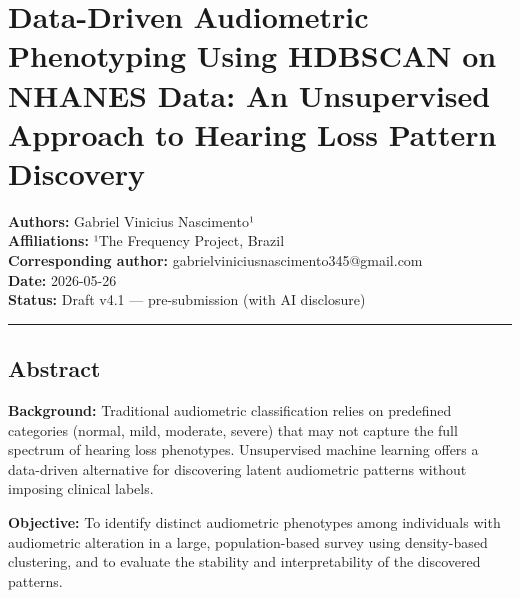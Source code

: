 \documentclass[
]{article}
\author{}
\date{}
\begin{document}

\vspace{1em}

\section{Data-Driven Audiometric Phenotyping Using HDBSCAN on NHANES Data: An
Unsupervised Approach to Hearing Loss Pattern
Discovery}\label{data-driven-audiometric-phenotyping-using-hdbscan-on-nhanes-data-an-unsupervised-approach-to-hearing-loss-pattern-discovery}

\textbf{Authors:} Gabriel Vinicius Nascimento¹\\
\textbf{Affiliations:} ¹The Frequency Project, Brazil\\
\textbf{Corresponding author:} gabrielviniciusnascimento345@gmail.com\\
\textbf{Date:} 2026-05-26\\
\textbf{Status:} Draft v4.1 --- pre-submission (with AI disclosure)

\begin{center}\rule{0.5\linewidth}{0.5pt}\end{center}

\subsection{Abstract}\label{abstract}

\textbf{Background:} Traditional audiometric classification relies on predefined
categories (normal, mild, moderate, severe) that may not capture the full
spectrum of hearing loss phenotypes. Unsupervised machine learning offers a
data-driven alternative for discovering latent audiometric patterns without
imposing clinical labels.

\textbf{Objective:} To identify distinct audiometric phenotypes among
individuals with audiometric alteration in a large, population-based survey
using density-based clustering, and to evaluate the stability and
interpretability of the discovered patterns.
\end{document}
